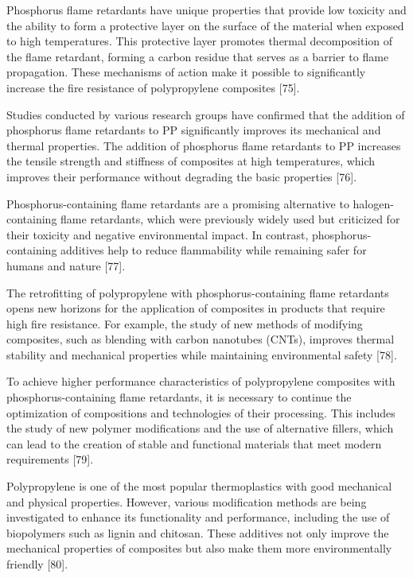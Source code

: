 \begin{multicols}{2}
Phosphorus flame retardants have unique properties that provide low
toxicity and the ability to form a protective layer on the surface of
the material when exposed to high temperatures. This protective layer
promotes thermal decomposition of the flame retardant, forming a carbon
residue that serves as a barrier to flame propagation. These mechanisms
of action make it possible to significantly increase the fire resistance
of polypropylene composites {[}75{]}.

Studies conducted by various research groups have confirmed that the
addition of phosphorus flame retardants to PP significantly improves its
mechanical and thermal properties. The addition of phosphorus flame
retardants to PP increases the tensile strength and stiffness of
composites at high temperatures, which improves their performance
without degrading the basic properties {[}76{]}.

Phosphorus-containing flame retardants are a promising alternative to
halogen-containing flame retardants, which were previously widely used
but criticized for their toxicity and negative environmental impact. In
contrast, phosphorus-containing additives help to reduce flammability
while remaining safer for humans and nature {[}77{]}.

The retrofitting of polypropylene with phosphorus-containing flame
retardants opens new horizons for the application of composites in
products that require high fire resistance. For example, the study of
new methods of modifying composites, such as blending with carbon
nanotubes (CNTs), improves thermal stability and mechanical properties
while maintaining environmental safety {[}78{]}.

To achieve higher performance characteristics of polypropylene
composites with phosphorus-containing flame retardants, it is necessary
to continue the optimization of compositions and technologies of their
processing. This includes the study of new polymer modifications and the
use of alternative fillers, which can lead to the creation of stable and
functional materials that meet modern requirements {[}79{]}.

Polypropylene is one of the most popular thermoplastics with good
mechanical and physical properties. However, various modification
methods are being investigated to enhance its functionality and
performance, including the use of biopolymers such as lignin and
chitosan. These additives not only improve the mechanical properties of
composites but also make them more environmentally friendly {[}80{]}.


\end{multicols}
